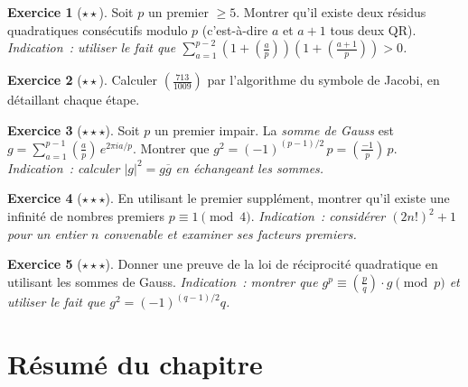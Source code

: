 \documentclass[12pt,a4paper,openany]{book}
\theoremstyle{definition}
\newtheorem{exercice}{Exercice}[chapter]
\theoremstyle{plain}
\theoremstyle{remark}
\newcommand{\abs}[1]{\left|#1\right|}
\newcommand{\legendre}[2]{\left(\frac{#1}{#2}\right)}
\newcommand{\jacobi}[2]{\left(\frac{#1}{#2}\right)}
\begin{document}
\begin{exercice}[$\star\star$]
\label{exo:qr-7}
Soit $p$ un premier $\geq 5$. Montrer qu'il existe deux résidus quadratiques
consécutifs modulo $p$ (c'est-à-dire $a$ et $a + 1$ tous deux QR).
\textit{Indication~: utiliser le fait que $\sum_{a=1}^{p-2} (1 + \legendre{a}{p})(1 + \legendre{a+1}{p}) > 0$.}
\end{exercice}

\begin{exercice}[$\star\star$]
\label{exo:qr-8}
Calculer $\jacobi{713}{1009}$ par l'algorithme du symbole de Jacobi, en
détaillant chaque étape.
\end{exercice}

\begin{exercice}[$\star\star\star$]
\label{exo:qr-9}
Soit $p$ un premier impair. La \emph{somme de Gauss} est
$g = \sum_{a=1}^{p-1} \legendre{a}{p} \, e^{2\pi i a / p}$.
Montrer que $g^2 = (-1)^{(p-1)/2} \, p = \legendre{-1}{p} \, p$.
\textit{Indication~: calculer $\abs{g}^2 = g \overline{g}$ en échangeant les
sommes.}
\end{exercice}

\begin{exercice}[$\star\star\star$]
\label{exo:qr-10}
En utilisant le premier supplément, montrer qu'il existe une infinité de
nombres premiers $p \equiv 1 \pmod{4}$.
\textit{Indication~: considérer $(2 n!)^2 + 1$ pour un entier $n$ convenable
et examiner ses facteurs premiers.}
\end{exercice}

\begin{exercice}[$\star\star\star$]
\label{exo:qr-11}
Donner une preuve de la loi de réciprocité quadratique en utilisant
les sommes de Gauss.
\textit{Indication~: montrer que $g^p \equiv \legendre{p}{q} \cdot g \pmod{p}$
et utiliser le fait que $g^2 = (-1)^{(q-1)/2} q$.}
\end{exercice}

\section*{Résumé du chapitre}
\end{document}
